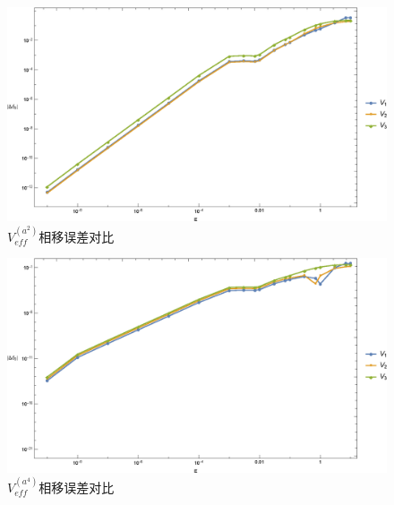 \documentclass[cs4size,titlepage,twoside]{ctexart}
\begin{document}
\begin{figure}[!htbp]
	\centering
	\includegraphics[width=6in]{MultiplePotential_4.eps}
	\caption{$V_{eff}^{(a^2)}$相移误差对比}\label{MP3}
\end{figure}
\begin{figure}[!htbp]
	\centering
	\includegraphics[width=6in]{MultiplePotential_6.eps}
	\caption{$V_{eff}^{(a^4)}$相移误差对比}\label{MP4}
\end{figure}
\end{document}
